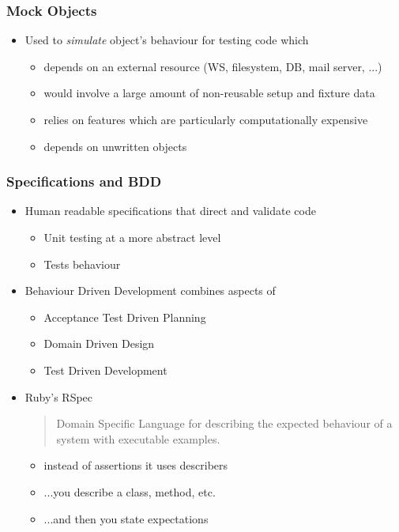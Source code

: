 \documentclass{beamer}
\begin{document}
\begin{frame}[fragile]\frametitle{Mock Objects} 
  \begin{itemize}
    \item Used to \textit{simulate} object's behaviour for testing code which
    \begin{itemize}
      \item depends on an external resource (WS, filesystem, DB, mail server, ...)
      \item would involve a large amount of non-reusable setup and fixture data
      \item relies on features which are particularly computationally expensive
      \item depends on unwritten objects
    \end{itemize}
  \end{itemize}
\end{frame}




\begin{frame}[fragile]\frametitle{Specifications and BDD} 
  \begin{itemize}
    \item Human readable specifications that direct and validate code
    \begin{itemize}
      \item Unit testing at a more abstract level
      \item Tests behaviour
    \end{itemize}
    \item Behaviour Driven Development combines aspects of
    \begin{itemize}
      \item Acceptance Test Driven Planning
      \item Domain Driven Design
      \item Test Driven Development
    \end{itemize}
    
    \item Ruby's RSpec
    \begin{quote}
      Domain Specific Language for describing the expected behaviour of a system with executable examples.
    \end{quote}
    \begin{itemize}
      \item instead of assertions it uses describers
      \item ...you describe a class, method, etc.
      \item ...and then you state expectations
    \end{itemize}
  \end{itemize}
\end{frame}
\end{document}
